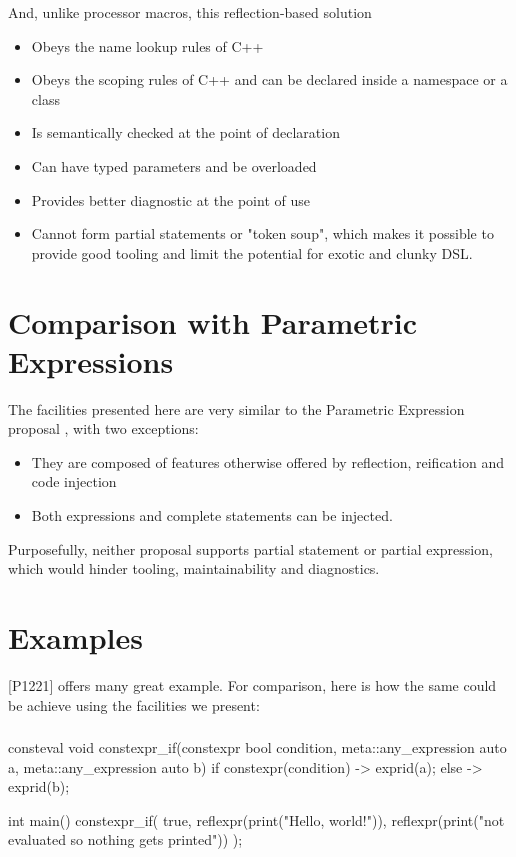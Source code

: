 \documentclass{wg21}
\begin{document}
And, unlike processor macros, this reflection-based solution
\begin{itemize}
    \item Obeys the name lookup rules of C++
    \item Obeys the scoping rules of C++ and can be declared inside a namespace or a class
    \item Is semantically checked at the point of declaration
    \item Can have typed parameters and be overloaded
    \item Provides better diagnostic at the point of use
    \item Cannot form partial statements or "token soup", which makes it possible to provide good tooling and limit the potential for exotic and clunky DSL.
\end{itemize}

\section{Comparison with Parametric Expressions}

The facilities presented here are very similar to the Parametric Expression proposal \cite{P1221R1}, with two exceptions:
\begin{itemize}
\item They are composed of features otherwise offered by reflection, reification and code injection
\item Both expressions and complete statements can be injected.
\end{itemize}

Purposefully, neither proposal supports partial statement or partial expression, which would hinder tooling, maintainability
and diagnostics.

\section{Examples}
[P1221] \cite{P1221R1} offers many great example.
For comparison, here is how the same could be achieve using the facilities we present:

\subsubsection{}


\begin{codeblock}
consteval void constexpr_if(constexpr bool condition, 
                   meta::any_expression auto a,
                   meta::any_expression auto b) {
    if constexpr(condition){
        -> exprid(a);
    }
    else {
        -> exprid(b);
    }
}

int main() {
    constexpr_if(
       true,
       reflexpr(print("Hello, world!")),
       reflexpr(print("not evaluated so nothing gets printed"))
    );
}
\end{codeblock}
\end{document}
